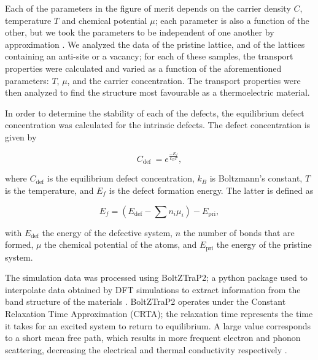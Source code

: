 \documentclass[7.5pt]{article}
\theoremstyle{plain}
\theoremstyle{definition}
\newcommand{\<}{\langle}
\renewcommand{\>}{\rangle}
\begin{document}
\begin{multicols}{2}
\noindent Each of the parameters in the figure of merit depends on the carrier density $C$, temperature $T$ and chemical potential $\mu$; each parameter is also a function of the other, but we took the parameters to be independent of one another by approximation \cite{alma9939162912205131}.
We analyzed the data of the pristine lattice, and of the lattices containing an anti-site or a vacancy; for each of these samples, the transport properties were calculated and varied as a function of the aforementioned parameters: $T$, $\mu$, and the carrier concentration. 
The transport properties were then analyzed to find the structure most favourable as a thermoelectric material.

In order to determine the stability of each of the defects, the equilibrium defect concentration was calculated for the intrinsic defects.
The defect concentration is given by


\begin{equation}
C_{\text {def }}=e^{\frac{-E_f}{k_B T}},
\label{eq:defectconcentration}
\end{equation}

\noindent where $C_{\text {def}}$ is the equilibrium defect concentration, $k_B$ is Boltzmann's constant, $T$ is the temperature, and $E_f$ is the defect formation energy.
The latter is defined as

\begin{equation}
E_f=\left(E_{\text {def}}-\sum n_i \mu_i\right)-E_{\text {pri}},
\label{eq:formationenergy}
\end{equation}

\noindent with $E_\text{def}$ the energy of the defective system, $n$ the number of bonds that are formed, $\mu$ the chemical potential of the atoms, and $E_{\text {pri}}$ the energy of the pristine system.

The simulation data was processed using BoltZTraP2; a python package used to interpolate data obtained by DFT simulations to extract information from the band structure of the materials \cite{MadsenGeorgK.H.2018Bapf}. 
BoltZTraP2 operates under the Constant Relaxation Time Approximation (CRTA); the relaxation time represents the time it takes for an excited system to return to equilibrium. 
A large value corresponds to a short mean free path, which results in more frequent electron and phonon scattering, decreasing the electrical and thermal conductivity respectively \cite{TakabatakeToshiro2014Petc}. 


\end{multicols}
\end{document}
